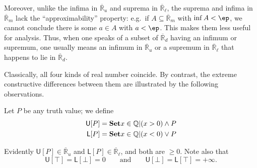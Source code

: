 \documentclass{article}
\def\Q{\mathbb{Q}}
\def\R{\mathbb{R}}
\def\Re{\overline{\R}}
\def\Red{\Re_d}
\def\Rem{\Re_m}
\def\Reu{\Re_u}
\def\Rel{\Re_{\ell}}
\def\U[#1]{\mathsf{U}[#1]}
\def\L[#1]{\mathsf{L}[#1]}
\begin{document}
Moreover, unlike the infima in $\Reu$ and suprema in $\Rel$, the suprema and infima in $\Rem$ lack the ``approximability'' property: e.g.\ if $A\subseteq \Rem$ with $\inf A < \ep$, we cannot conclude there is some $a\in A$ with $a<\ep$.
This makes them less useful for analysis.
Thus, when one speaks of a subset of $\Red$ having an infimum or supremum, one usually means an infimum in $\Reu$ or a supremum in $\Rel$ that happens to lie in $\Red$.

Classically, all four kinds of real number coincide.
By contrast, the extreme constructive differences between them are illustrated by the following observations.

\begin{defn}
  Let $P$ be any truth value; we define
  \begin{align*}
    \U[P] &= \setof{x\in \Q | (x>0) \land P}\\
    \L[P] &= \setof{x\in \Q | (x<0) \lor P}
  \end{align*}
\end{defn}

Evidently $\U[P] \in \Reu$ and $\L[P]\in \Rel$, and both are $\ge 0$.
Note also that
\[\U[\top] = \L[\bot] = 0 \qquad\text{and}\qquad \U[\bot] = \L[\top] = +\infty.\]
\end{document}
